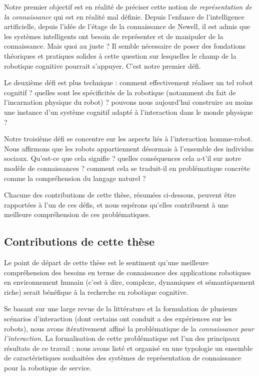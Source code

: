Notre premier objectif est en réalité de préciser cette notion de
\emph{représentation de la connaissance} qui est en réalité mal définie. Depuis
l'enfance de l'intelligence artificielle, depuis l'idée de \og  l'étage de la
connaissance \fg de Newell, il est admis que les systèmes intelligents ont
besoin de représenter et de manipuler de la connaissance. Mais quoi au juste ?
Il semble nécessaire de poser des fondations théoriques et pratiques solides à
cette question sur lesquelles le champ de la robotique cognitive pourrait
s'appuyer. C'est notre premier défi.

Le deuxième défi est plus technique : comment effectivement réaliser un tel
robot cognitif ? quelles sont les spécificités de la robotique (notamment du
fait de l'incarnation physique du robot) ? pouvons nous aujourd'hui construire
au moins une instance d'un système cognitif adapté à l'interaction dans le
monde physique ?

Notre troisième défi se concentre sur les aspects liés à l'interaction
homme-robot. Nous affirmons que les robots appartiennent désormais à l'ensemble
des individus sociaux. Qu'est-ce que cela signifie ? quelles conséquences cela
a-t'il sur notre modèle de connaissances ? comment cela se traduit-il en
problématique concrète comme la compréhension du langage naturel ?

Chacune des contributions de cette thèse, résumées ci-dessous, peuvent être
rapportées à l'un de ces défis, et nous espérons qu'elles contribuent à une
meilleure compréhension de ces problématiques.


\subsection{Contributions de cette thèse}
\label{sect|contributions}

Le point de départ de cette thèse est le sentiment qu'une meilleure
compréhension des besoins en terme de connaissance des applications robotiques
en environnement humain (c'est à dire, complexe, dynamiques et sémantiquement
riche) serait bénéfique à la recherche en robotique cognitive.

Se basant sur une large revue de la littérature et la formulation de plusieurs
scénarios d'interaction (dont certains ont conduit a des expériences sur les
robots), nous avons itérativement affiné la problématique de la
\emph{connaissance pour l'interaction}. La formalisation de cette problématique
est l'un des principaux résultats de ce travail : nous avons listé et organisé
en une typologie un ensemble de caractéristiques souhaitées des systèmes de
représentation de connaissance pour la robotique de service.

